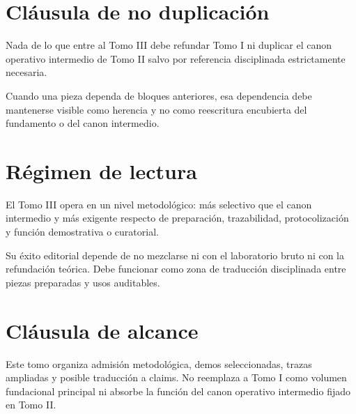 \section{Cláusula de no duplicación}
\begin{observation}
Nada de lo que entre al Tomo III debe refundar Tomo I ni duplicar el canon operativo intermedio de Tomo II salvo por referencia disciplinada estrictamente necesaria.
\end{observation}

\begin{observation}
Cuando una pieza dependa de bloques anteriores, esa dependencia debe mantenerse visible como herencia y no como reescritura encubierta del fundamento o del canon intermedio.
\end{observation}

\section{Régimen de lectura}
\begin{observation}
El Tomo III opera en un nivel metodológico: más selectivo que el canon intermedio y más exigente respecto de preparación, trazabilidad, protocolización y función demostrativa o curatorial.
\end{observation}

\begin{observation}
Su éxito editorial depende de no mezclarse ni con el laboratorio bruto ni con la refundación teórica. Debe funcionar como zona de traducción disciplinada entre piezas preparadas y usos auditables.
\end{observation}

\section{Cláusula de alcance}
\begin{observation}
Este tomo organiza admisión metodológica, demos seleccionadas, trazas ampliadas y posible traducción a claims. No reemplaza a Tomo I como volumen fundacional principal ni absorbe la función del canon operativo intermedio fijado en Tomo II.
\end{observation}


